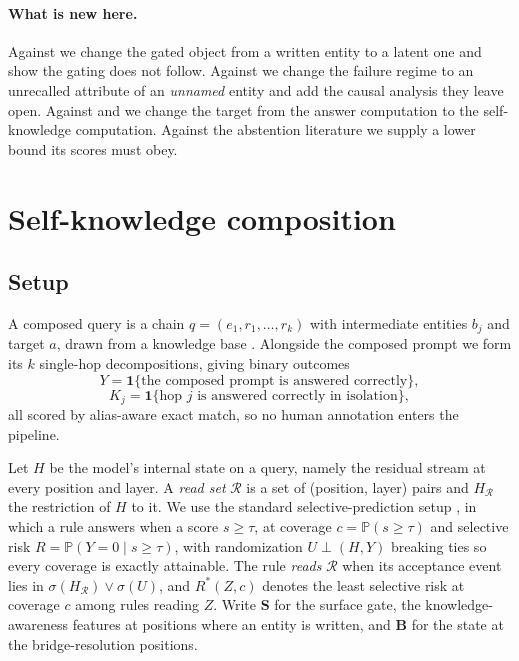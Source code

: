 \documentclass{article}
\newcommand{\gate}{\mathbf{S}}
\newcommand{\bridge}{\mathbf{B}}
\begin{document}
\paragraph{What is new here.} Against \citet{ferrando2025entity} we change the gated object from a
written entity to a latent one and show the gating does not follow. Against
\citet{tamoyan2025factual} we change the failure regime to an unrecalled attribute of an
\emph{unnamed} entity and add the causal analysis they leave open. Against \citet{yang2024latent}
and \citet{biran2024hopping} we change the target from the answer computation to the self-knowledge
computation. Against the abstention literature we supply a lower bound its scores must obey.

\section{Self-knowledge composition}
\label{sec:theory}

\subsection{Setup}

A composed query is a chain $q=(e_1,r_1,\dots,r_k)$ with intermediate entities $b_j$ and target $a$,
drawn from a knowledge base \citep{vrandecic2014wikidata}. Alongside the composed prompt we form its
$k$ single-hop decompositions, giving binary outcomes
\[
Y=\mathbf{1}\{\text{the composed prompt is answered correctly}\},
\]
\[
K_j=\mathbf{1}\{\text{hop }j\text{ is answered correctly in isolation}\},
\]
all scored by alias-aware exact match, so no human annotation enters the pipeline.

Let $H$ be the model's internal state on a query, namely the residual stream at every position and
layer. A \emph{read set} $\mathcal{R}$ is a set of (position, layer) pairs and $H_{\mathcal{R}}$ the
restriction of $H$ to it. We use the standard selective-prediction setup
\citep{chow1970optimum,elyaniv2010foundations}, in which a rule answers when a score $s\ge\tau$, at
coverage $c=\mathbb{P}(s\ge\tau)$ and selective risk $R=\mathbb{P}(Y=0\mid s\ge\tau)$, with
randomization $U\perp(H,Y)$ breaking ties so every coverage is exactly attainable. The rule
\emph{reads} $\mathcal{R}$ when its acceptance event lies in $\sigma(H_{\mathcal{R}})\vee\sigma(U)$,
and $R^\ast(Z,c)$ denotes the least selective risk at coverage $c$ among rules reading $Z$. Write
$\gate$ for the surface gate, the knowledge-awareness features at positions where an entity is
written, and $\bridge$ for the state at the bridge-resolution positions.
\end{document}
